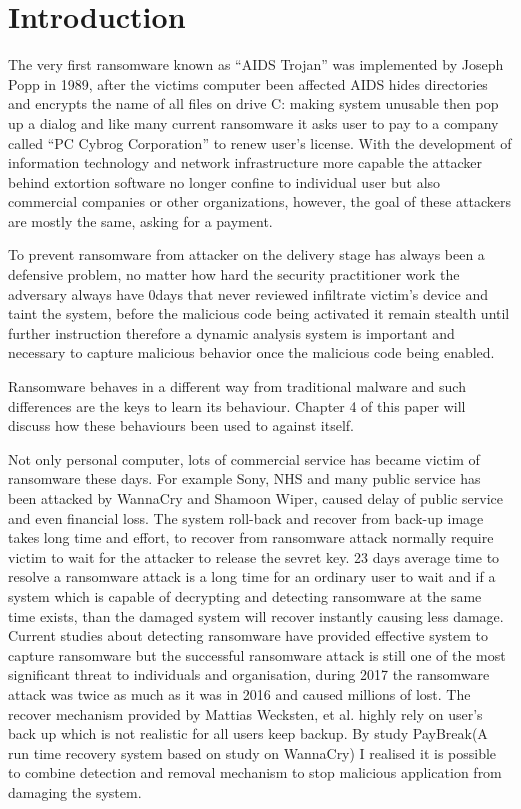 \documentclass[]{PLR-ShaofengLiu}
\begin{document}
\chapter{Introduction}
The very first ransomware known as “AIDS Trojan” was implemented by 
Joseph Popp in 1989, after the victims computer been affected AIDS hides 
directories and encrypts the name of all files on drive C: making system 
unusable then pop up a dialog and like many current ransomware it asks 
user to pay to a company called “PC Cybrog Corporation” to renew user’s 
license. With the development of information technology and network 
infrastructure more capable the attacker behind extortion software no 
longer confine to individual user but also commercial companies or other 
organizations, however, the goal of these attackers are mostly the same, 
asking for a payment.\cite{AIDS}

To prevent ransomware from attacker on the delivery stage has always been 
a defensive problem, no matter how hard the security practitioner work the 
adversary always have 0days that never reviewed infiltrate victim’s device 
and taint the system, before the malicious code being activated it remain 
stealth until further instruction therefore a dynamic analysis system is 
important and necessary to capture malicious behavior once the malicious 
code being enabled. 

Ransomware behaves in a different way from traditional malware and such 
differences are the keys to learn its behaviour. Chapter 4 
of this paper will discuss how these behaviours been used to against 
itself.         

Not only personal computer, lots of commercial service has became victim 
of ransomware these days. For example Sony, NHS\cite{CBS:2017} and many 
public service has been attacked by WannaCry and Shamoon Wiper, caused 
delay of public service and even financial loss. The system roll-back and 
recover from back-up image takes long time and effort, to recover from 
ransomware attack normally require victim to wait for the attacker to 
release the sevret key. 23 days average time to resolve a ransomware attack\cite{ACC} is a long 
time for an ordinary user to wait and if a system which is capable of decrypting 
and detecting ransomware at the same time exists, than the damaged system will recover instantly causing less damage.
Current studies about detecting ransomware have provided effective system 
to capture ransomware but the successful ransomware attack is still one of 
the most significant threat to individuals and organisation, during 2017 
the ransomware attack was twice as much as it was in 2016\cite{ACC} and caused 
millions of lost. The recover mechanism provided by Mattias Wecksten, et al. 
highly rely on user’s back up which is not realistic for all users keep 
backup.\cite{IEEE 2nd:2016} By study PayBreak\cite{PayBreak:2017}(A run time recovery system based on study on 
WannaCry) I realised it is possible to combine detection and removal 
mechanism to stop malicious application from damaging the system.
\end{document}
